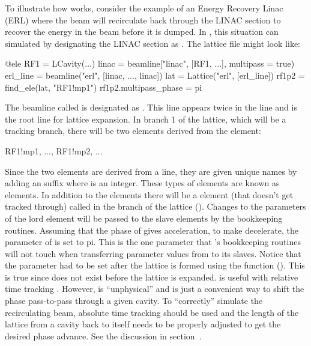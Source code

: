 To illustrate how  works, consider the example of an Energy Recovery Linac (ERL) where
the beam will recirculate back through the LINAC section to recover the energy in the beam before it
is dumped. In \accellat, this situation can simulated by designating the LINAC section as .
The lattice file might look like:
\begin{example}
  @ele RF1 = LCavity(...)
  linac = beamline["linac", [RF1, ...], multipass = true)
  erl_line = beamline("erl", [linac, ..., linac])
  lat = Lattice("erl", [erl_line])
  rf1p2 = find_ele(lat, "RF1!mp1")
  rf1p2.multipass_phase = pi
\end{example}
The beamline called  is designated as . This  line appears twice in
the line  and  is the root line for lattice expansion. 
In branch 1 of the 
lattice, which will be a tracking branch, there will be two elements derived from the  element:
\begin{example}
  RF1!mp1, ..., RF1!mp2, ...
\end{example}
Since the two elements are derived from a  line, they are given unique names by adding
an  suffix where  is an integer. 
These types of elements are known as  elements. In
addition to the  elements there will be a  element (that doesn't
get tracked through) called  in the  branch of the lattice ().
Changes to the parameters of the lord  element will be passed to the slave elements by the \accellat
bookkeeping routines. Assuming that the phase of  gives acceleration, to make 
decelerate, the  parameter of  is set to pi. This is the one parameter
that \accellat's bookkeeping routines will not touch when transferring parameter values from  to
its slaves. Notice that the  parameter had to be set after the lattice is formed
using the  function (). This is true since 
 does not exist before the lattice is expanded.  is useful with
relative time tracking . However,  is ``unphysical'' and is just
a convenient way to shift the phase pass-to-pass through a given cavity. To ``correctly'' simulate
the recirculating beam, absolute time tracking should be used and the length of the lattice from a
cavity back to itself needs to be properly adjusted to get the desired phase advance. See the discussion
in section~.

